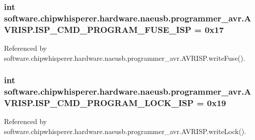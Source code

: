 \subsubsection[{I\+S\+P\+\_\+\+C\+M\+D\+\_\+\+P\+R\+O\+G\+R\+A\+M\+\_\+\+F\+U\+S\+E\+\_\+\+I\+S\+P}]{\setlength{\rightskip}{0pt plus 5cm}int software.\+chipwhisperer.\+hardware.\+naeusb.\+programmer\+\_\+avr.\+A\+V\+R\+I\+S\+P.\+I\+S\+P\+\_\+\+C\+M\+D\+\_\+\+P\+R\+O\+G\+R\+A\+M\+\_\+\+F\+U\+S\+E\+\_\+\+I\+S\+P = 0x17\hspace{0.3cm}{\ttfamily [static]}}\label{classsoftware_1_1chipwhisperer_1_1hardware_1_1naeusb_1_1programmer__avr_1_1AVRISP_a4721a0a7e1ed28046f6547ae99a0358b}


Referenced by software.\+chipwhisperer.\+hardware.\+naeusb.\+programmer\+\_\+avr.\+A\+V\+R\+I\+S\+P.\+write\+Fuse().

\hypertarget{classsoftware_1_1chipwhisperer_1_1hardware_1_1naeusb_1_1programmer__avr_1_1AVRISP_a8d3bf3e15dfc2d6f8309bb28f1f0e9a1}{}
\subsubsection[{I\+S\+P\+\_\+\+C\+M\+D\+\_\+\+P\+R\+O\+G\+R\+A\+M\+\_\+\+L\+O\+C\+K\+\_\+\+I\+S\+P}]{\setlength{\rightskip}{0pt plus 5cm}int software.\+chipwhisperer.\+hardware.\+naeusb.\+programmer\+\_\+avr.\+A\+V\+R\+I\+S\+P.\+I\+S\+P\+\_\+\+C\+M\+D\+\_\+\+P\+R\+O\+G\+R\+A\+M\+\_\+\+L\+O\+C\+K\+\_\+\+I\+S\+P = 0x19\hspace{0.3cm}{\ttfamily [static]}}\label{classsoftware_1_1chipwhisperer_1_1hardware_1_1naeusb_1_1programmer__avr_1_1AVRISP_a8d3bf3e15dfc2d6f8309bb28f1f0e9a1}


Referenced by software.\+chipwhisperer.\+hardware.\+naeusb.\+programmer\+\_\+avr.\+A\+V\+R\+I\+S\+P.\+write\+Lock().

